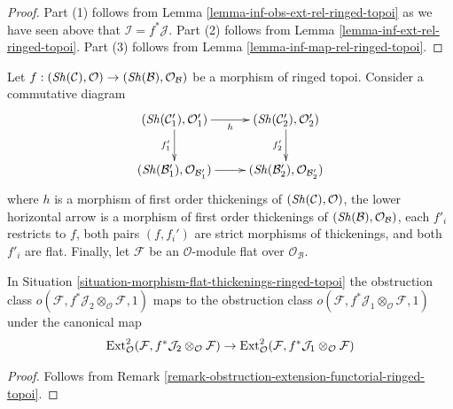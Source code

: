 \begin{proof}
Part (1) follows from Lemma \ref{lemma-inf-obs-ext-rel-ringed-topoi}
as we have seen above that $\mathcal{I} = f^*\mathcal{J}$.
Part (2) follows from Lemma \ref{lemma-inf-ext-rel-ringed-topoi}.
Part (3) follows from Lemma \ref{lemma-inf-map-rel-ringed-topoi}.
\end{proof}

\begin{situation}
\label{situation-morphism-flat-thickenings-ringed-topoi}
Let $f : (\mathop{\mathit{Sh}}\nolimits(\mathcal{C}), \mathcal{O}) \to
(\mathop{\mathit{Sh}}\nolimits(\mathcal{B}), \mathcal{O}_\mathcal{B})$ be a morphism of
ringed topoi. Consider a commutative diagram
$$
\xymatrix{
(\Sh(\mathcal{C}'_1), \mathcal{O}'_1) \ar[r]_h \ar[d]_{f'_1} &
(\Sh(\mathcal{C}'_2), \mathcal{O}'_2) \ar[d]_{f'_2} \\
(\Sh(\mathcal{B}'_1), \mathcal{O}_{\mathcal{B}'_1}) \ar[r] &
(\Sh(\mathcal{B}'_2), \mathcal{O}_{\mathcal{B}'_2})
}
$$
where $h$ is a morphism of first order thickenings
of $(\mathop{\mathit{Sh}}\nolimits(\mathcal{C}), \mathcal{O})$, the lower horizontal arrow
is a morphism of first order thickenings of
$(\mathop{\mathit{Sh}}\nolimits(\mathcal{B}), \mathcal{O}_\mathcal{B})$, each $f'_i$ restricts
to $f$, both pairs $(f, f_i')$ are strict morphisms of thickenings, and
both $f'_i$ are flat. Finally, let $\mathcal{F}$ be an
$\mathcal{O}$-module flat over $\mathcal{O}_\mathcal{B}$.
\end{situation}

\begin{lemma}
\label{lemma-functorial-ringed-topoi}
In Situation \ref{situation-morphism-flat-thickenings-ringed-topoi}
the obstruction class
$o(\mathcal{F}, f^*\mathcal{J}_2 \otimes_\mathcal{O} \mathcal{F}, 1)$
maps to the obstruction class
$o(\mathcal{F}, f^*\mathcal{J}_1 \otimes_\mathcal{O} \mathcal{F}, 1)$
under the canonical map
$$
\mathop{\mathrm{Ext}}\nolimits^2_\mathcal{O}(
\mathcal{F}, f^*\mathcal{J}_2 \otimes_\mathcal{O} \mathcal{F})
\to \mathop{\mathrm{Ext}}\nolimits^2_\mathcal{O}(
\mathcal{F}, f^*\mathcal{J}_1 \otimes_\mathcal{O} \mathcal{F})
$$
\end{lemma}

\begin{proof}
Follows from Remark \ref{remark-obstruction-extension-functorial-ringed-topoi}.
\end{proof}

